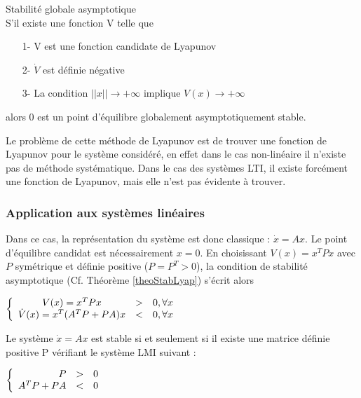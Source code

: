 \begin{theo} Stabilité globale asymptotique\\
	\label{theoStabLyap}
	S'il existe une fonction V telle que
	\begin{itemize}
		\item[1-] V est une fonction candidate de Lyapunov
		\item[2-] $\dot{V}$ est définie négative
		\item[3-] La condition $||x|| \rightarrow +\infty$ implique $V(x) \rightarrow +\infty$
	\end{itemize}
	alors 0 est un point d'équilibre globalement asymptotiquement stable.
\end{theo}

Le problème de cette méthode de Lyapunov est de trouver une fonction de Lyapunov pour le système considéré, en effet dans le cas non-linéaire il n'existe pas de méthode systématique. Dans le cas des systèmes LTI, il existe forcément une fonction de Lyapunov, mais elle n'est pas évidente à trouver.

\subsubsection{Application aux systèmes linéaires}
Dans ce cas, la représentation du système est donc classique : $\dot{x} = Ax$. Le point d'équilibre candidat est nécessairement $x = 0$. En choisissant $V(x) = x^TPx$ avec $P$ symétrique et définie positive ($P = P^T > 0$), la condition de stabilité asymptotique (Cf. Théorème \ref{theoStabLyap}) s'écrit alors 
\begin{center}
	$   \left \{
	\begin{array}{c c l}
	V(x) = x^TPx & > & 0, \forall x \\
	\dot{V}(x) = x^T(A^TP + PA)x & < & 0, \forall x
	\end{array}
	\right. $
\end{center}

\begin{theo}
	Le système $\dot{x} = Ax$ est stable si et seulement si il existe une matrice définie positive P vérifiant le système LMI suivant : 
	\begin{center}
		$   \left \{
		\begin{array}{r c l}
		P & > & 0 \\
		A^TP + PA & < & 0
		\end{array}
		\right. $
	\end{center}
\end{theo}

